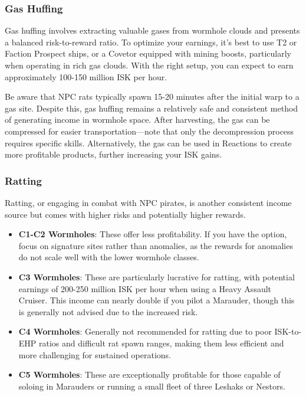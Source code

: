 \documentclass[a4paper,12pt]{article}
\begin{document}
\subsubsection{Gas Huffing}

Gas huffing involves extracting valuable gases from wormhole clouds and presents a balanced risk-to-reward ratio. To optimize your earnings, it's best to use T2 or Faction Prospect ships, or a Covetor equipped with mining boosts, particularly when operating in rich gas clouds. With the right setup, you can expect to earn approximately 100-150 million ISK per hour.

Be aware that NPC rats typically spawn 15-20 minutes after the initial warp to a gas site. Despite this, gas huffing remains a relatively safe and consistent method of generating income in wormhole space. After harvesting, the gas can be compressed for easier transportation—note that only the decompression process requires specific skills. Alternatively, the gas can be used in Reactions to create more profitable products, further increasing your ISK gains.

\subsubsection{Ratting}

Ratting, or engaging in combat with NPC pirates, is another consistent income source but comes with higher risks and potentially higher rewards.

\begin{itemize}
    \item \textbf{C1-C2 Wormholes}: These offer less profitability. If you have the option, focus on signature sites rather than anomalies, as the rewards for anomalies do not scale well with the lower wormhole classes.
    \item \textbf{C3 Wormholes}: These are particularly lucrative for ratting, with potential earnings of 200-250 million ISK per hour when using a Heavy Assault Cruiser. This income can nearly double if you pilot a Marauder, though this is generally not advised due to the increased risk.
    \item \textbf{C4 Wormholes}: Generally not recommended for ratting due to poor ISK-to-EHP ratios and difficult rat spawn ranges, making them less efficient and more challenging for sustained operations.
    \item \textbf{C5 Wormholes}: These are exceptionally profitable for those capable of soloing in Marauders or running a small fleet of three Leshaks or Nestors.
\end{itemize}
\end{document}

